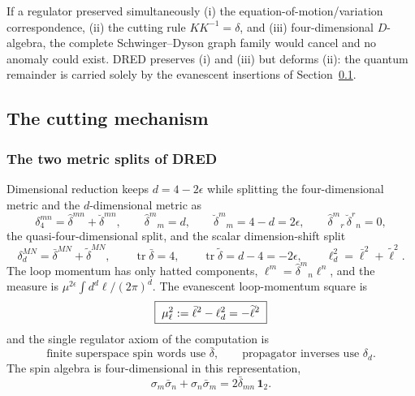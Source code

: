 \begin{remark}\label{rem:ss:separation}
If a regulator preserved simultaneously (i) the equation-of-motion/variation
correspondence, (ii) the cutting rule $KK^{-1}=\delta$, and (iii)
four-dimensional $D$-algebra, the complete Schwinger--Dyson graph family would
cancel and no anomaly could exist. DRED preserves (i) and (iii) but deforms
(ii): the quantum remainder is carried solely by the evanescent insertions of
Section~\ref{sec:superspace:cutting}.
\end{remark}

\subsection{The cutting mechanism}\label{sec:superspace:cutting}

\subsubsection*{The two metric splits of DRED}

Dimensional reduction keeps $d=4-2\epsilon$ while splitting the
four-dimensional metric and the $d$-dimensional metric as
\begin{equation}\label{eq:ss:dredsplit}
\delta_4^{mn}=\widehat\delta^{mn}+\breve\delta^{mn},
\qquad
\widehat\delta^{m}{}_{m}=d,
\qquad
\breve\delta^{m}{}_{m}=4-d=2\epsilon,
\qquad
\widehat\delta^{m}{}_{r}\,\breve\delta^{r}{}_{n}=0 ,
\end{equation}
the quasi-four-dimensional split, and the scalar dimension-shift split
\begin{equation}\label{eq:ss:scalarsplit}
\delta_d^{MN}=\bar\delta^{MN}+\widetilde\delta^{MN},
\qquad
\operatorname{tr}\bar\delta=4,
\qquad
\operatorname{tr}\widetilde\delta=d-4=-2\epsilon,
\qquad
\ell_d^{2}=\bar\ell^{2}+\widetilde\ell^{2} .
\end{equation}
The loop momentum has only hatted components,
$\ell^{m}=\widehat\delta^{m}{}_{n}\ell^{n}$, and the measure is
$\mu^{2\epsilon}\int d^{d}\ell/(2\pi)^{d}$. The evanescent loop-momentum square
is
\begin{equation}\label{eq:ss:mul}
\boxed{\;\mu_\ell^{2}:=\bar\ell^{2}-\ell_d^{2}=-\widetilde\ell^{2}\;}
\end{equation}
and the single regulator axiom of the computation is
\begin{equation}\label{eq:ss:axiom}
\boxed{\;\text{finite superspace spin words use }\bar\delta,
\qquad\text{propagator inverses use }\delta_d .\;}
\end{equation}
The spin algebra is four-dimensional in this representation,
\begin{equation}\label{eq:ss:sigmaalgebra}
\sigma_m\bar\sigma_n+\sigma_n\bar\sigma_m=2\bar\delta_{mn}\,\mathbf 1_2 .
\end{equation}

